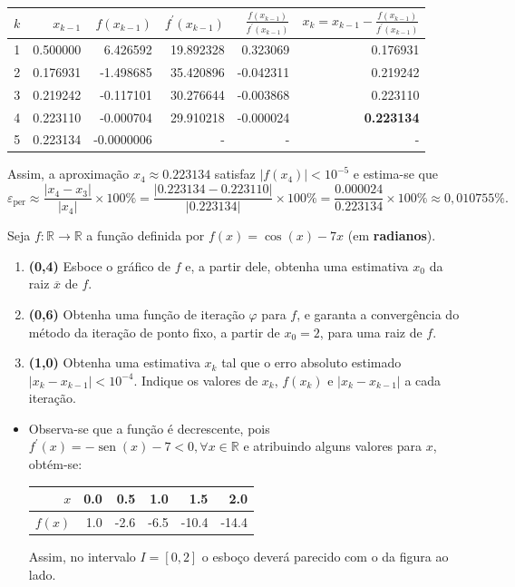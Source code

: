 \documentclass[12pt,a4paper]{article}
\newcommand*\sen{\operatorname{sen}}
\newcommand*\R{\mathbb{R}}
\begin{document}
\begin{ExerciseList}
\begin{center}
\begin{tabular}{|r|r|r|r|r|r|}
\hline
$k$ &  $x_{k-1}$ & $f(x_{k-1})$ & $f^\prime(x_{k-1})$ & $\frac{f(x_{k-1})}{f^\prime(x_{k-1})}$ & $x_k = x_{k-1} - \frac{f(x_{k-1})}{f^\prime(x_{k-1})}$ \\
\hline
1 & 0.500000 &  6.426592 & 19.892328 &0.323069 & 0.176931 \\
\hline
2 & 0.176931 & -1.498685 & 35.420896 &-0.042311 & 0.219242 \\
\hline
3 & 0.219242 & -0.117101 & 30.276644 &-0.003868 & 0.223110 \\
\hline
4 & 0.223110 & -0.000704 & 29.910218 &-0.000024 & \textbf{0.223134} \\
\hline
5 & 0.223134 & -0.0000006 & - & - & - \\
\hline
\end{tabular}
\end{center}
\medskip
Assim, a aproximação $x_4 \approx 0.223134$ satisfaz $| f(x_4) | < 10^{-5}$ e estima-se que
\[
\varepsilon_{\text{per}}
\approx
\frac{|x_4 - x_3|}{|x_4|} \times 100\%
= \frac{|0.223134 - 0.223110|}{|0.223134|} \times 100\%
= \frac{0.000024}{0.223134} \times 100\%
\approx 0,010755\%.
\]


\Exercise%
Seja $f: \R \to \R$ a função definida por $f(x) = \cos(x) - 7x$ (em \textbf{radianos}).
\begin{enumerate}
\item \textbf{(0,4)} Esboce o gráfico de $f$ e, a partir dele, obtenha uma estimativa $x_0$ da raiz $\overline{x}$ de $f$.
\item \textbf{(0,6)} Obtenha uma função de iteração $\varphi$ para $f$, e garanta a convergência do método da iteração de ponto fixo, a partir de $x_0 = 2$, para uma raiz de $f$.
\item \textbf{(1,0)} Obtenha uma estimativa $x_k$ tal que o erro absoluto estimado $|x_k - x_{k-1}| < 10^{-4}$. Indique os valores de $x_k$, $f(x_k)$ e $|x_k - x_{k-1}|$ a cada iteração.
\end{enumerate}
\Answer
\vspace{-0.5cm}
\begin{itemize}
\item \begin{minipage}[c]{0.51\textwidth}
Observa-se que a função é decrescente, pois $f^\prime(x) = -\sen(x) - 7 < 0, \forall x \in \R$ e atribuindo alguns valores para $x$, obtém-se:
\begin{center}
\begin{tabular}{|r|r|r|r|r|r|}
\hline
$x$    & 0.0 &  0.5 &  1.0 &   1.5 &   2.0 \\
\hline
$f(x)$ & 1.0 & -2.6 & -6.5 & -10.4 & -14.4 \\
\hline
\end{tabular}
\end{center}
Assim, no intervalo $I = [0, 2]$ o esboço deverá parecido com o da figura ao lado.


\end{minipage}
\end{itemize}
\end{ExerciseList}
\end{document}
